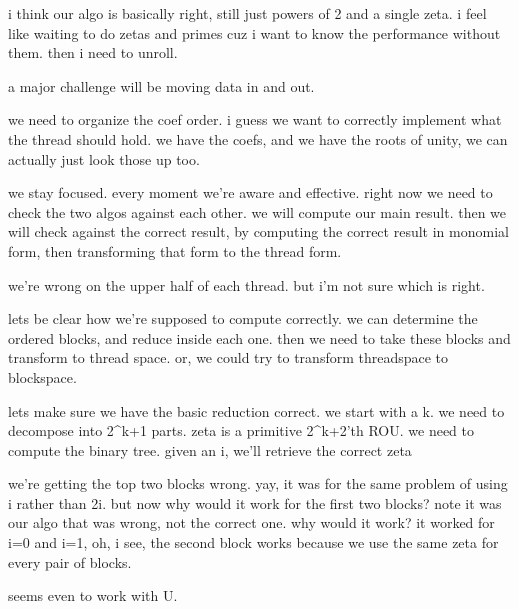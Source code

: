 i think our algo is basically right, still just powers of 2 and a single zeta.
i feel like waiting to do zetas and primes cuz i want to know the performance without them.
then i need to unroll. 


a major challenge will be moving data in and out.



we need to organize the coef order.
i guess we want to correctly implement what the thread should hold. 
we have the coefs, and we have the roots of unity, we can actually just look those up too.

we stay focused.
every moment we're aware and effective.
right now we need to check the two algos against each other.
we will compute our main result. then we will check against the correct result, by computing the correct result in monomial form, then transforming that form to the thread form.

we're wrong on the upper half of each thread. but i'm not sure which is right.

lets be clear how we're supposed to compute correctly.
we can determine the ordered blocks, and reduce inside each one.
then we need to take these blocks and transform to thread space.
or, we could try to transform threadspace to blockspace.

lets make sure we have the basic reduction correct.
we start with a k. we need to decompose into 2^{k+1} parts.
zeta is a primitive 2^{k+2}'th ROU. 
we need to compute the binary tree.
given an i, we'll retrieve the correct zeta

we're getting the top two blocks wrong.
yay, it was for the same problem of using i rather than 2i.
but now why would it work for the first two blocks?
note it was our algo that was wrong, not the correct one.
why would it work?
it worked for i=0 and i=1,
oh, i see, the second block works because we use the same zeta for every pair of blocks.

seems even to work with U.

